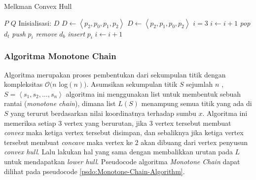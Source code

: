 \begin{algorithm}
	\caption{Melkman Convex Hull}
	\label{psdo:Melkman-Convex-Hull}
	\begin{algorithmic}[1]
		\Require $P$
		\Ensure $Q$
        \State Inisialisasi: $D$
            \State$D \leftarrow \left \langle p_2, p_0, p_1, p_2 \right \rangle$
        \Else
            \State $D \leftarrow \left \langle p_2, p_1, p_0, p_2 \right \rangle$
        \EndIf
        \State $i=3$
                \State $i \leftarrow i+1$
            \EndWhile
                \State \textit{pop} $d_t$
            \EndWhile
            \State \textit{push} $p_i$
                \State \textit{remove} $d_b$
            \EndWhile
            \State \textit{insert} $p_i$
            \State $i \leftarrow i+1$
        \EndWhile
	\end{algorithmic}
\end{algorithm}

\subsubsection{ Algoritma Monotone Chain}
\label{sec:algoritma-monotone-chain}
Algoritma \MC merupakan proses pembentukan \CH dari sekumpulan titik dengan kompleksitas $\mathcal{O}(n$ log$(n))$\cite{monotone_chain_algorithm}. Asumsikan sekumpulan titik $S$ sejumlah $n$ ,$S = \left \langle s_1, s_2, ..., s_n\right \rangle$ algoritma ini menggunakan list untuk membentuk sebuah rantai (\textit{monotone chain}), dimana list $L(S)$ menampung semua titik yang ada di $S$ yang terurut berdasarkan nilai koordinatnya terhadap sumbu $x$. Algoritma ini memeriksa setiap 3 vertex yang berurutan, jika 3 vertex tersebut membuat \textit{convex} maka ketiga vertex tersebut disimpan, dan sebaliknya jika ketiga vertex tersebut membuat \textit{concave} maka vertex ke 2 akan dibuang dari vertex penyusun \textit{convex hull}. Lalu lakukan hal yang sama dengan membalikkan urutan pada $L$ untuk mendapatkan \textit{lower hull}. Pseudocode algoritma \textit{Monotone Chain} dapat dilihat pada pseudocode \ref{psdo:Monotone-Chain-Algorithm}.

